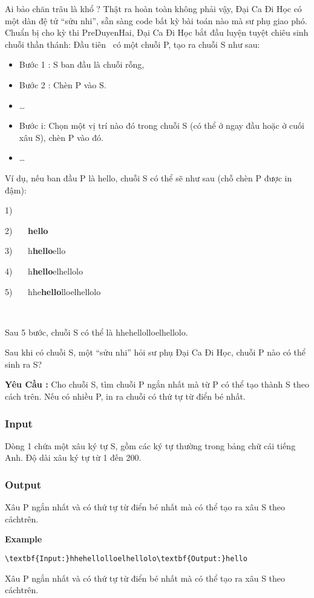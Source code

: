 

Ai bảo chăn trâu là khổ ? Thật ra hoàn toàn không phải vậy, Đại Ca Đi Học có một dàn đệ tử “sửu nhi”, sẵn sàng code bất kỳ bài toán nào mà sư phụ giao phó. Chuẩn bị cho kỳ thi PreDuyenHai, Đại Ca Đi Học bắt đầu luyện tuyệt chiêu sinh chuỗi thần thánh: Đầu tiên  có một chuỗi P, tạo ra chuỗi S như sau:
\begin{itemize}
	\item Bước 1 : S ban đầu là chuỗi rỗng,
	\item Bước 2 : Chèn P vào S.
	\item …
	\item Bước i: Chọn một vị trí nào đó trong chuỗi S (có thể ở ngay đầu hoặc ở cuối xâu S), chèn P vào đó.
	\item … 
\end{itemize}

Ví dụ, nếu ban đầu P là hello, chuỗi S có thể sẽ như sau (chỗ chèn P được in đậm):

1)

2)    \textbf{hello}

3)    h\textbf{hello}ello

4)    h\textbf{hello}elhellolo

5)    hhe\textbf{hello}lloelhellolo

 

Sau 5 bước, chuỗi S có thể là hhehellolloelhellolo.

Sau khi có chuỗi S, một “sửu nhi” hỏi sư phụ Đại Ca Đi Học, chuỗi P nào có thể sinh ra S?

\textbf{Yêu Cầu : }Cho chuỗi S, tìm chuỗi P ngắn nhất mà từ P có thể tạo thành S theo cách trên. Nếu có nhiều P, in ra chuỗi có thứ tự từ điển bé nhất.

\subsubsection{Input}

Dòng 1 chứa một xâu ký tự S, gồm các ký tự thường trong bảng chữ cái tiếng Anh. Độ dài xâu ký tự từ 1 đến 200.

\subsubsection{Output}

Xâu P ngắn nhất và có thứ tự từ điển bé nhất mà có thể tạo ra xâu S theo cáchtrên.

\textbf{Example}
\begin{verbatim}
\textbf{Input:}hhehellolloelhellolo\textbf{Output:}hello\end{verbatim}

Xâu P ngắn nhất và có thứ tự từ điển bé nhất mà có thể tạo ra xâu S theo cáchtrên.